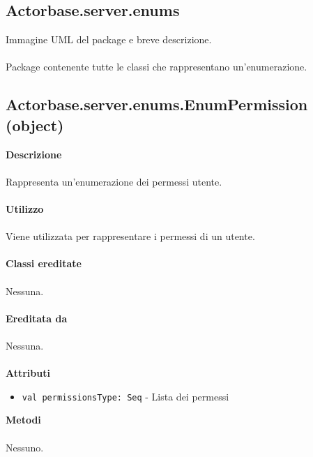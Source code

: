\documentclass[a4paper]{article}
\begin{document}
		\subsection{Actorbase.server.enums}
		Immagine UML del package e breve descrizione.
		\\ \\
		Package contenente tutte le classi che rappresentano un'enumerazione.
		
		\subsection{Actorbase.server.enums.EnumPermission (object)}
		\textbf{Descrizione}
			\\ \\
			Rappresenta un'enumerazione dei permessi utente.
			\\ \\
		\textbf{Utilizzo}
			\\ \\
			Viene utilizzata per rappresentare i permessi di un utente.
			\\ \\
		\textbf{Classi ereditate}
		\\ \\
			Nessuna.
			\\ \\
		\textbf{Ereditata da}
		\\ \\
			Nessuna.
			\\ \\
		\textbf{Attributi}
			\begin{itemize}
				\item \texttt{val permissionsType: Seq}  - Lista dei permessi
			\end{itemize}
		\textbf{Metodi}
			\\ \\
			Nessuno.
		
\end{document}
